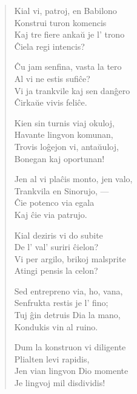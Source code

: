 \begin{verse}
                     Kial vi, patroj, en Babilono\\
                     \vin   Konstrui turon komencis\\
                     Kaj tre fiere anka\u u je l' trono\\
                     \vin   \^Ciela regi intencis?

                     \^Cu jam senfina, vasta la tero\\
                     \vin   Al vi ne estis sufi\^ce?\\
                     Vi ja trankvile kaj sen dan\^gero\\
                      \vin  \^Cirka\u ue vivis feli\^ce.

                     Kien sin turnis viaj okuloj,\\
                     \vin   Havante lingvon komunan,\\
                     Trovis lo\^gejon vi, anta\u uuloj,\\
                      \vin  Bonegan kaj oportunan!

                     Jen al vi pla\^cis monto, jen valo,\\
                     \vin   Trankvila en Sinorujo, ---\\
                     \^Cie potenco via egala\\
                      \vin  Kaj \^cie via patrujo.

                     Kial deziris vi do subite\\
                     \vin   De l' val' suriri \^cielon?\\
                     Vi per argilo, brikoj malsprite\\
                     \vin   Atingi pensis la celon?

                     Sed entrepreno via, ho, vana,\\
                     \vin   Senfrukta restis je l' fino;\\
                     Tuj \^gin detruis Dia la mano,\\
                     \vin   Kondukis vin al ruino.

                     Dum la konstruon vi diligente\\
                     \vin   Plialten levi rapidis,\\
                     Jen vian lingvon Dio momente\\
                     \vin   Je lingvoj mil disdividis!


\end{verse}
